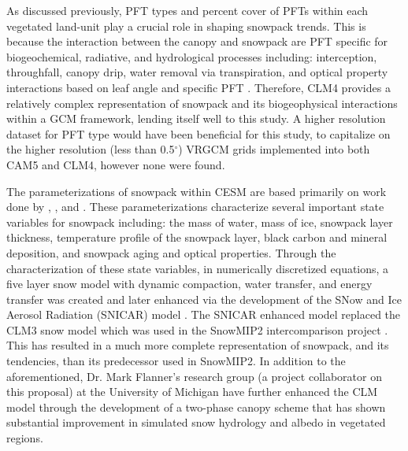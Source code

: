 \documentclass[11pt]{article}
\begin{document}
As discussed previously, PFT types and percent cover of PFTs within each vegetated land-unit play a crucial role in shaping snowpack trends. This is because the interaction between the canopy and snowpack are PFT specific for biogeochemical, radiative, and hydrological processes including: interception, throughfall, canopy drip, water removal via transpiration, and optical property interactions based on leaf angle and specific PFT \citep{lawrence2011parameterization}.  Therefore, CLM4 provides a relatively complex representation of snowpack and its biogeophysical interactions within a GCM framework, lending itself well to this study.   A higher resolution dataset for PFT type would have been beneficial for this study, to capitalize on the higher resolution (less than 0.5$^\circ$) VRGCM grids implemented into both CAM5 and CLM4, however none were found.

The parameterizations of snowpack within CESM are based primarily on work done by \citet{anderson1976point}, \citet{jordan1991one}, and \citet{yongjiu1997land}. These parameterizations characterize several important state variables for snowpack including: the mass of water, mass of ice, snowpack layer thickness, temperature profile of the snowpack layer, black carbon and mineral deposition, and snowpack aging and optical properties. Through the characterization of these state variables, in numerically discretized equations, a five layer snow model with dynamic compaction, water transfer, and energy transfer was created and later enhanced via the development of the SNow and Ice Aerosol Radiation (SNICAR) model \citep{lawrence2011parameterization}.  The SNICAR enhanced model replaced the CLM3 snow model which was used in the SnowMIP2 intercomparison project \citep{rutter2009SnowMIP2}.  This has resulted in a much more complete representation of snowpack, and its tendencies, than its predecessor used in SnowMIP2.  In addition to the aforementioned, Dr. Mark Flanner's research group (a project collaborator on this proposal) at the University of Michigan have further enhanced the CLM model through the development of a two-phase canopy scheme that has shown substantial improvement in simulated snow hydrology and albedo in vegetated regions.

\end{document}
